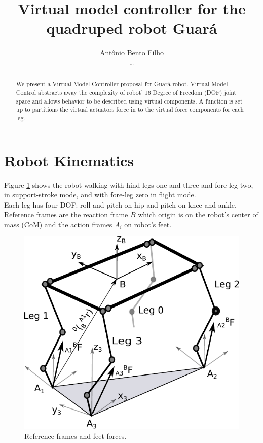 \documentclass[]{article}
\title{Virtual model controller for the quadruped robot Guar\'a}
\author{Ant\^onio Bento Filho\\\dots}
\begin{document}
\maketitle

\begin{abstract}
We present a Virtual Model Controller \cite{pratt_virtual_1996} proposal for Guará robot. Virtual Model Control abstracts away the complexity of robot' 16 Degree of Freedom (DOF) joint space and allows behavior to be described using virtual components. A function is set up to partitions the virtual actuators force in to the virtual force components for each leg.
\end{abstract}
\section{Robot Kinematics}%
Figure \ref{fig:guarawolflegs} shows the robot walking with hind-legs one and three  and fore-leg two, in support-stroke mode, and with fore-leg zero in flight mode.\\ Each leg has four DOF: roll and pitch on hip and pitch on knee and ankle. Reference frames are the reaction frame $B$ which origin is on the robot's center of mass (CoM) and the action frames $A_i$ on robot's feet.	
\begin{figure}%
	\centering
	\includegraphics[scale=0.5]{"Figuras/GuaraWolfLegs"}
	\caption{Reference frames and feet forces.}
	\label{fig:guarawolflegs}
\end{figure}
\end{document}

